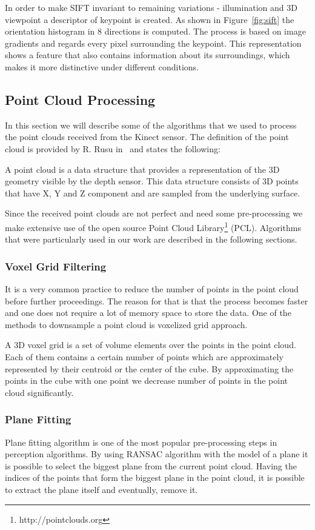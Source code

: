 In order to make SIFT invariant to remaining variations - illumination and 3D viewpoint a descriptor of keypoint is created. As shown in Figure~\ref{fig:sift} the orientation histogram in 8 directions is computed. The process is based on image gradients and regards every pixel surrounding the keypoint. This representation shows a feature that also contains information about its surroundings, which makes it more distinctive under different conditions.


\subsection{Point Cloud Processing}
In this section we will describe some of the algorithms that we used to process the point clouds received from the Kinect sensor. The definition of the point cloud is provided by R. Rusu in~\cite{Rusu_ICRA2011_PCL} and states the following:

A point cloud is a data structure that provides a representation of the 3D geometry visible by the depth sensor. This data structure consists of 3D points that have X, Y and Z component and are sampled from the underlying surface.  

Since the received point clouds are not perfect and need some pre-processing we make extensive use of the open source Point Cloud Library\footnote{http://pointclouds.org} (PCL). Algorithms that were particularly used in our work are described in the following sections.

\subsubsection{Voxel Grid Filtering}
It is a very common practice to reduce the number of points in the point cloud before further proceedings. The reason for that is that the process becomes faster and one does not require a lot of memory space to store the data. One of the methods to downsample a point cloud is voxelized grid approach.

A 3D voxel grid is a set of volume elements over the points in the point cloud. Each of them contains a certain number of points which are approximately represented by their centroid or the center of the cube. By approximating the points in the cube with one point we decrease number of points in the point cloud significantly. 

\subsubsection{Plane Fitting}
Plane fitting algorithm is one of the most popular pre-processing steps in perception algorithms. By using RANSAC algorithm with the model of a plane it is possible to select the biggest plane from the current point cloud. Having the indices of the points that form the biggest plane in the point cloud, it is possible to extract the plane itself and eventually, remove it. 

